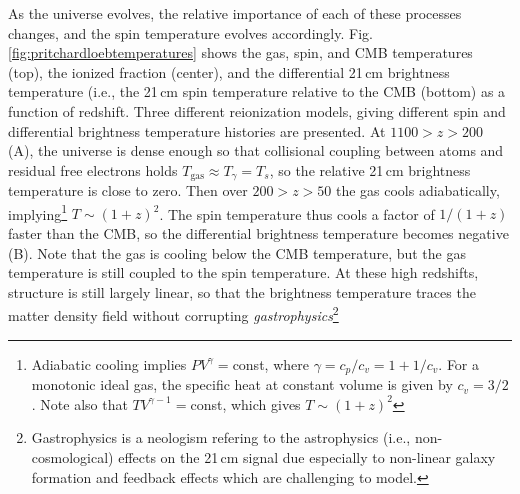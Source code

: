 As the universe evolves, the relative importance of each of these processes changes, and the spin temperature evolves accordingly. Fig. \ref{fig:pritchardloebtemperatures} shows the gas, spin, and CMB temperatures (top), the ionized fraction (center), and the differential 21\,cm brightness temperature (i.e., the 21\,cm spin temperature relative to the CMB (bottom) as a function of redshift. Three different reionization models, giving different spin and differential brightness temperature histories are presented. At $1100>z>200$ (A), the universe is dense enough so that collisional coupling between atoms and residual free electrons holds $T_\text{gas}\approx T_\gamma=T_s$, so the relative 21\,cm brightness temperature is close to zero. Then over $200>z>50$ the gas cools adiabatically, implying\footnote{Adiabatic cooling implies $PV^\gamma=$const, where $\gamma=c_p/c_v=1+1/c_v$. For a monotonic ideal gas, the specific heat at constant volume is given by $c_v=3/2$. Note also that $TV^{\gamma-1}=$const, which gives $T\sim (1+z)^2$} $T\sim (1+z)^2$. The spin temperature thus cools a factor of $1/(1+z)$ faster than the CMB, so the differential brightness temperature becomes negative (B). Note that the gas is cooling below the CMB temperature, but the gas temperature is still coupled to the spin temperature. At these high redshifts, structure is still largely linear, so that the brightness temperature traces the matter density field without corrupting \textit{gastrophysics}\footnote{Gastrophysics is a neologism refering to the astrophysics (i.e., non-cosmological) effects on the 21\,cm signal due especially to non-linear galaxy formation and feedback effects which are challenging to model.} 

